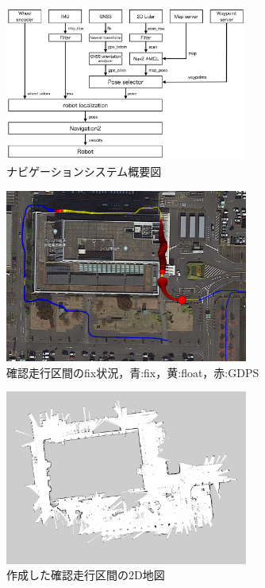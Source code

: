 \documentclass[platex,dvipdfmx]{rbproceedings}
\begin{document}
\begin{figure}[htbp]
    \centering   
    \includegraphics[keepaspectratio,width=80mm]{fig/system.png}
    \caption{ナビゲーションシステム概要図}
    \label{fig:system}
\end{figure}

\begin{figure}[h]
    \centering   
    \includegraphics[keepaspectratio,width=80mm]{fig/cityhall_fix.png}
    \caption{確認走行区間のfix状況，青:fix，黄:float，赤:GDPS}
    \label{fig:cityhall_fix}
\end{figure}

\begin{figure}[h]
    \centering   
    \includegraphics[keepaspectratio,width=80mm]{fig/map.png}
    \caption{作成した確認走行区間の2D地図}
    \label{fig:map}
\end{figure}
\end{document}
